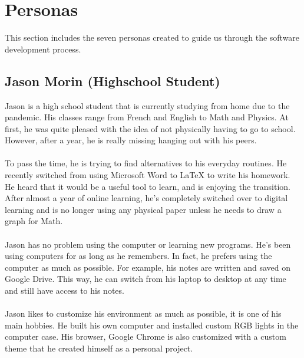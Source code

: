 \documentclass[11pt,onside]{report}
\begin{document}
\section{Personas}
\begin{description}
This section includes the seven personas created to guide us through the software development process.
\end{description}

\subsection{Jason Morin (Highschool Student)}
\begin{description}
Jason is a high school student that is currently studying from home due to the pandemic. His classes range from French and English to Math and Physics. At first, he was quite pleased with the idea of not physically having to go to school. However, after a year, he is really missing hanging out with his peers. \\ \\

To pass the time, he is trying to find alternatives to his everyday routines. He recently switched from using Microsoft Word to \LaTeX{} to write his homework. He heard that it would be a useful tool to learn, and is enjoying the transition. After almost a year of online learning, he’s completely switched over to digital learning and is no longer using any physical paper unless he needs to draw a graph for Math.  \\ \\

Jason has no problem using the computer or learning new programs. He’s been using computers for as long as he remembers. In fact, he prefers using the computer as much as possible. For example, his notes are written and saved on Google Drive. This way, he can switch from his laptop to desktop at any time and still have access to his notes. \\ \\

Jason likes to customize his environment as much as possible, it is one of his main hobbies. He built his own computer and installed custom RGB lights in the computer case. His browser, Google Chrome is also customized with a custom theme that he created himself as a personal project.
\end{description}
\end{document}
